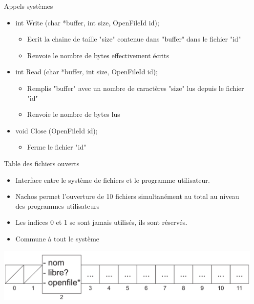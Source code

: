 \documentclass{beamer}
\begin{document}
\begin{frame}
	\begin{block}{Appels systèmes}
		\begin{itemize}
			\item<1-> int Write (char *buffer, int size, OpenFileId id);
			\begin{itemize}
				\item<1->Ecrit la chaine de taille "size" contenue dans "buffer" dans le fichier "id"
				\item<1->Renvoie le nombre de bytes effectivement écrits
			\end{itemize}
			\item<2-> int Read (char *buffer, int size, OpenFileId id);
			\begin{itemize}
				\item<1->Remplis "buffer" avec un nombre de caractères "size" lus depuis le fichier "id"
				\item<1->Renvoie le nombre de bytes lus
			\end{itemize}	
			\item<3-> void Close (OpenFileId id);
			\begin{itemize}
				\item<1->Ferme le fichier "id"
			\end{itemize}		
		\end{itemize}
	\end{block}
\end{frame}

\begin{frame}
	\begin{block}{Table des fichiers ouverts}
		\begin{itemize}
			\item<1-> Interface entre le système de fichiers et le programme utilisateur.
			\item<1-> Nachos permet l'ouverture de 10 fichiers simultanément au total au niveau des programmes utilisateurs
			\item<1-> Les indices 0 et 1 se sont jamais utilisés, ils sont réservés.
			\item<1-> Commune à tout le système
		\end{itemize}		
	\end{block}	
  	\begin{center}
	  	\includegraphics[scale=0.2]{images/FS2.png}
  	\end{center}	
\end{frame}

\begin{frame}
  \titlepage
\end{frame}
\end{document}

